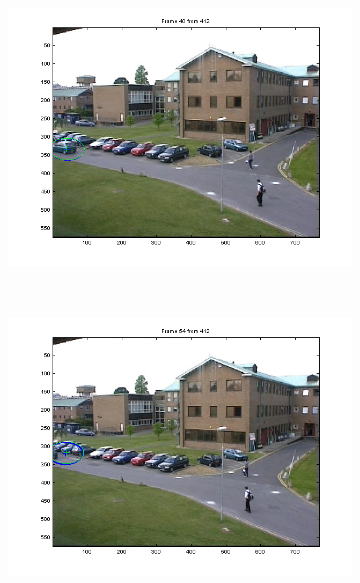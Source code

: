 \documentclass[hyperref={pdfpagelabels=false}]{beamer}
\begin{document}
\begin{frame}
\begin{figure}
\begin{subfigure}[b]{0.3\textwidth}
                 \includegraphics[width=\textwidth]{results/PETS01D1Human1car/Frame0040.png}
         \end{subfigure}
         \\
         \begin{subfigure}[b]{0.3\textwidth}
                 \includegraphics[width=\textwidth]{results/PETS01D1Human1car/Frame0054.png}
         \end{subfigure}
         \begin{subfigure}[b]{0.3\textwidth}

\end{subfigure}
\end{figure}
\end{frame}
\end{document}
